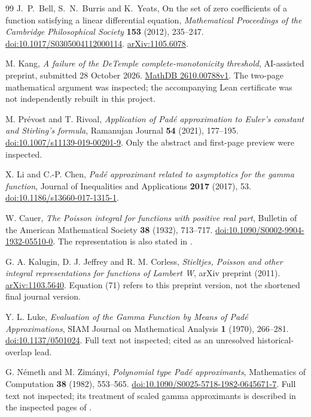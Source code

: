 \documentclass[11pt,a4paper]{article}
\theoremstyle{definition}
\theoremstyle{remark}
\numberwithin{equation}{section}
\begin{document}
\begin{thebibliography}{99}
J.~P.~Bell, S.~N.~Burris and K.~Yeats,
On the set of zero coefficients of a function satisfying a linear
differential equation,
\emph{Mathematical Proceedings of the Cambridge Philosophical Society}
\textbf{153} (2012), 235--247.
\href{https://doi.org/10.1017/S0305004112000114}{doi:10.1017/S0305004112000114}.
\href{https://arxiv.org/abs/1105.6078}{arXiv:1105.6078}.

M. Kang,
\emph{A failure of the DeTemple complete-monotonicity threshold},
AI-assisted preprint, submitted 28 October 2026.
\href{https://mathdb.com/abs/2610.00788v1}{MathDB 2610.00788v1}.
The two-page mathematical argument was inspected; the accompanying
Lean certificate was not independently rebuilt in this project.


M. Pr\'evost and T. Rivoal,
\emph{Application of Pad\'e approximation to Euler's constant and
Stirling's formula}, Ramanujan Journal \textbf{54} (2021), 177--195.
\href{https://doi.org/10.1007/s11139-019-00201-9}{doi:10.1007/s11139-019-00201-9}.
Only the abstract and first-page preview were inspected.

X. Li and C.-P. Chen,
\emph{Pad\'e approximant related to asymptotics for the gamma function},
Journal of Inequalities and Applications \textbf{2017} (2017), 53.
\href{https://doi.org/10.1186/s13660-017-1315-1}{doi:10.1186/s13660-017-1315-1}.


W. Cauer,
\emph{The Poisson integral for functions with positive real part},
Bulletin of the American Mathematical Society \textbf{38} (1932), 713--717.
\href{https://doi.org/10.1090/S0002-9904-1932-05510-0}{doi:10.1090/S0002-9904-1932-05510-0}.
The representation is also stated in \cite[Eq.~(71)]{Kalugin2011}.

G. A. Kalugin, D. J. Jeffrey and R. M. Corless,
\emph{Stieltjes, Poisson and other integral representations for functions
of Lambert W}, arXiv preprint (2011).
\href{https://arxiv.org/abs/1103.5640}{arXiv:1103.5640}.
Equation (71) refers to this preprint version, not the shortened final
journal version.

Y. L. Luke,
\emph{Evaluation of the Gamma Function by Means of Pad\'e Approximations},
SIAM Journal on Mathematical Analysis \textbf{1} (1970), 266--281.
\href{https://doi.org/10.1137/0501024}{doi:10.1137/0501024}.
Full text not inspected; cited as an unresolved historical-overlap lead.

G. N\'emeth and M. Zim\'anyi,
\emph{Polynomial type Pad\'e approximants},
Mathematics of Computation \textbf{38} (1982), 553--565.
\href{https://doi.org/10.1090/S0025-5718-1982-0645671-7}{doi:10.1090/S0025-5718-1982-0645671-7}.
Full text not inspected; its treatment of scaled gamma approximants is
described in the inspected pages of \cite{McCabe1989}.


\end{thebibliography}
\end{document}
